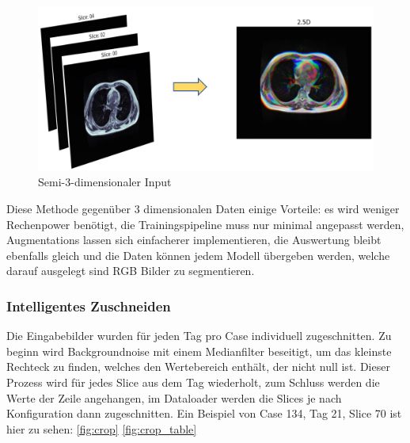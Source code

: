 \begin{figure}[htb]
	\begin{center}
		\includegraphics[width=450pt]{bilder/25d_input}
		\caption{Semi-3-dimensionaler Input}\label{Fig:25d-data}
	\end{center}
\end{figure}

Diese Methode gegenüber 3 dimensionalen Daten einige Vorteile: es wird weniger Rechenpower benötigt, die Trainingspipeline muss nur minimal angepasst werden, Augmentations lassen sich einfacherer implementieren, die Auswertung bleibt ebenfalls gleich und die Daten können jedem Modell übergeben werden, welche darauf ausgelegt sind RGB Bilder zu segmentieren.

\subsubsection{Intelligentes Zuschneiden}

Die Eingabebilder wurden für jeden Tag pro Case individuell zugeschnitten. Zu beginn wird  Backgroundnoise mit einem Medianfilter beseitigt, um das kleinste Rechteck zu finden, welches den Wertebereich enthält, der nicht null ist. Dieser Prozess wird für jedes Slice aus dem Tag wiederholt, zum Schluss werden die Werte der Zeile angehangen, im Dataloader werden die Slices je nach Konfiguration dann zugeschnitten. Ein Beispiel von Case 134, Tag 21, Slice 70 ist hier zu sehen: \autoref{fig:crop} \autoref{fig:crop_table} 

